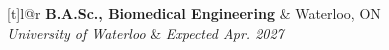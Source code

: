 \documentclass[10pt]{article}
\begin{document}
    \begin{rsbox}[frametitle = {EDUCATION}]
        
        \begin{tabularx}{\textwidth}[t]{l@{\extracolsep{\fill}}r}
            \textbf{B.A.Sc., Biomedical Engineering} & Waterloo, ON \\
            \textit{University of Waterloo} & \textit{Expected Apr. 2027} \\
             \\
        \end{tabularx}

    \end{rsbox}
\end{document}
